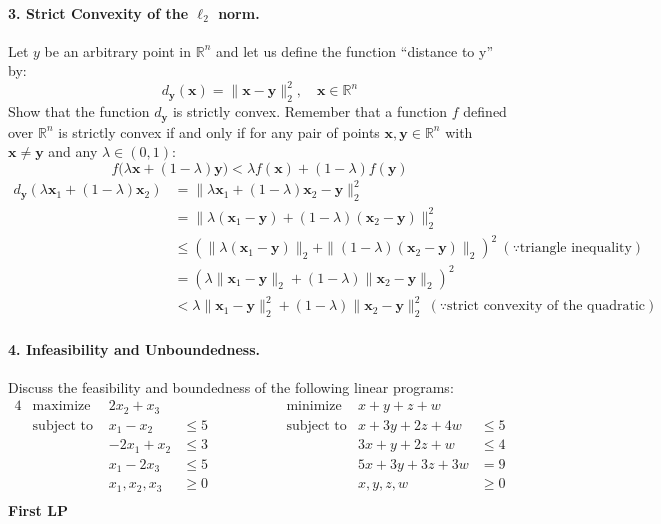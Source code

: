 \documentclass[11pt]{article}
\newcommand{\bx}{\mathbf{x}}
\newcommand{\by}{\mathbf{y}}
\begin{document}
\paragraph{3. Strict Convexity of the $\ell_2$ norm.}

Let $y$ be an arbitrary point in $\mathbb{R}^n$ and let us define the function
``distance to y'' by:
\begin{displaymath}
    d_{\by}(\bx) = \|\bx-\by\|_2^2,
    \quad \bx\in\mathbb{R}^n
\end{displaymath}
Show that the function $d_{\by}$ is strictly convex. Remember that a function $f$
defined over $\mathbb{R}^n$ is strictly convex if and only if for any pair of
points $\bx, \by\in\mathbb{R}^n$ with $\bx\neq \by$ and any $\lambda\in(0,1)$:
\begin{displaymath}
    f\big(\lambda \bx + (1-\lambda)\by\big) < \lambda f(\bx) + (1-\lambda) f(\by)
\end{displaymath}
\color{blue}
\begin{align*}
d_{\by}(\lambda\bx_1+(1-\lambda)\bx_2) &= \|\lambda \bx_1+(1-\lambda)\bx_2-\by\|_2^2 &\\
&= \|\lambda (\bx_1-\by)+(1-\lambda)(\bx_2-\by)\|_2^2 &\\
&\leq (\|\lambda (\bx_1-\by)\|_2+\| (1-\lambda)(\bx_2-\by) \|_2)^2 \ (\because \text{triangle inequality}) &\\
&= (\lambda \| \bx_1-\by\|_2+(1-\lambda) \| \bx_2-\by \|_2)^2  &\\
&< \lambda \| \bx_1-\by\|_2^2 + (1-\lambda) \| \bx_2-\by \|_2^2  \ (\because \text{strict convexity of the quadratic})
\end{align*}
\color{black}
\paragraph{4. Infeasibility and Unboundedness.} 

Discuss the feasibility and boundedness of the following linear programs:
\begin{alignat*}{4}
    &\text{maximize }   & 2x_2 + x_3&  &\qquad\qquad&\text{minimize}&x+y+z+w&\\
    &\text{subject to } & x_1 - x_2 &\leq 5&\qquad\qquad&\text{subject to}&x+3y+2z+4w&\leq 5\\
    &                   & -2x_1 + x_2 &\leq 3&\qquad\qquad&&3x+y+2z+w&\leq 4\\
    &                   & x_1 - 2x_3&\leq 5&\qquad\qquad&&5x+3y+3z+3w&=9\\
    &                   &x_1, x_2, x_3&\geq 0&\qquad\qquad&&x, y, z, w&\geq 0\\
\end{alignat*}
\color{blue}
\textbf{First LP}
\end{document}
